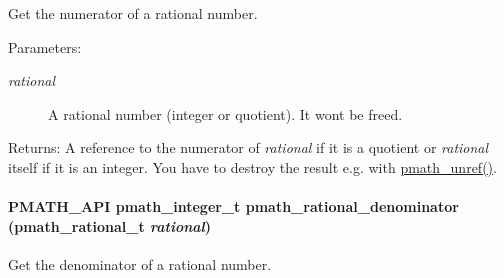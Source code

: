 Get the numerator of a rational number. 

\begin{Desc}
\item[Parameters:]
\begin{description}
\item[{\em rational}]A rational number (integer or quotient). It wont be freed. \end{description}
\end{Desc}
\begin{Desc}
\item[Returns:]A reference to the numerator of {\em rational\/} if it is a quotient or {\em rational\/} itself if it is an integer. You have to destroy the result e.g. with \hyperlink{classpmath__t_54e905402c38940687033b87eb8c6c9f}{pmath\_\-unref()}. \end{Desc}
\hypertarget{group__numbers_ga3f1718d2252ebce77bed83df7223f4c}{
\paragraph[{pmath\_\-rational\_\-denominator}]{\setlength{\rightskip}{0pt plus 5cm}PMATH\_\-API {\bf pmath\_\-integer\_\-t} pmath\_\-rational\_\-denominator ({\bf pmath\_\-rational\_\-t} {\em rational})}\hfill}
\label{group__numbers_ga3f1718d2252ebce77bed83df7223f4c}


Get the denominator of a rational number. 

